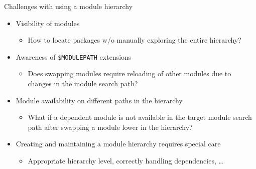 \documentclass[10pt,xcolor={usenames,dvipsnames}]{beamer}
\begin{document}
\begin{frame}{Challenges with using a module hierarchy}
\begin{itemize}
    \item
        Visibility of modules
        \begin{itemize}
            \item
                How to locate packages w/o manually exploring the entire
                hierarchy?
        \end{itemize}
    \item
        Awareness of \texttt{\$MODULEPATH} extensions
        \begin{itemize}
            \item
                Does swapping modules require reloading of other modules due
                to changes in the module search path?
        \end{itemize}
    \item
        Module availability on different paths in the hierarchy
        \begin{itemize}
            \item
                What if a dependent module is not available in the target
                module search path after swapping a module lower in the
                hierarchy?
        \end{itemize}
    \item
        Creating and maintaining a module hierarchy requires special care
        \begin{itemize}
            \item
                Appropriate hierarchy level, correctly handling dependencies, \ldots
        \end{itemize}
\end{itemize}
\end{frame}

\end{document}
